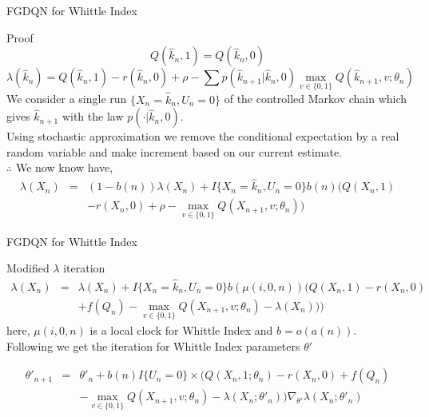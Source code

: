 \documentclass{beamer}
\begin{document}
\begin{frame}{FGDQN for Whittle Index}
\begin{block}{Proof}
\begin{equation}
    Q(\hat{k}_n,1) = Q(\hat{k}_n,0)\nonumber
\end{equation}
\begin{equation}
    \lambda(\hat{k}_n) = Q(\hat{k}_n,1)-r(\hat{k}_n,0)+\rho-\sum p(\hat{k}_{n+1}|\hat{k}_n,0)\max_{v\in\{0,1\}}Q(\hat{k}_{n+1},v;\theta_n)\nonumber
\end{equation} 
We consider a single run $\{X_n=\hat{k}_n,U_n=0\}$ of the controlled Markov chain which gives $\hat{k}_{n+1}$ with the law $p(\cdot|\hat{k}_n,0)$. 
\\Using stochastic approximation we remove the conditional expectation by a real random variable and make increment based on our current estimate.
\\$\therefore$ We now know have,
\begin{eqnarray}
\lambda(X_n) &=& (1-b(n))\lambda(X_n)+ I\{X_n=\hat{k}_n,U_n=0\}b(n)\Big(Q(X_n,1)\nonumber \\
&&-r(X_n,0)+\rho-\max_{v\in\{0,1\}}Q(X_{n+1},v;\theta_n)\Big)\nonumber
\end{eqnarray}

\end{block}
\end{frame}




\begin{frame}{FGDQN for Whittle Index}
\begin{block}{Modified $\lambda$ iteration}
\begin{eqnarray}
\label{whittleiteration}
\lambda(X_n) &=& \lambda(X_n)+ I\{X_n=\hat{k}_n,U_n=0\}b(\mu(i,0,n)) \Big(Q(X_n,1)-r(X_n,0)\nonumber \\&&+f(Q_n)-\max_{v\in\{0,1\}}Q(X_{n+1},v;\theta_n)-\lambda(X_n))\Big)\nonumber
\end{eqnarray}
here, $\mu(i,0,n)$ is a local clock for Whittle Index and $b=o(a(n))$.\\
Following we get the iteration for Whittle Index parameters $\theta'$

\begin{eqnarray}
\theta'_{n+1} &=& \theta'_n+b(n)I\{U_n=0\}\times\Big(Q(X_n,1;\theta_n)-r(X_n,0)+f(Q_n)\nonumber \\&&
-\max_{v\in\{0,1\}} Q(X_{n+1}, v; \theta_n)-\lambda(X_n;\theta'_n)\Big)\nabla_{\theta'}\lambda(X_n;\theta'_n)\nonumber
\label{method2}\end{eqnarray}
\end{block}
    
\end{frame}
\end{document}
